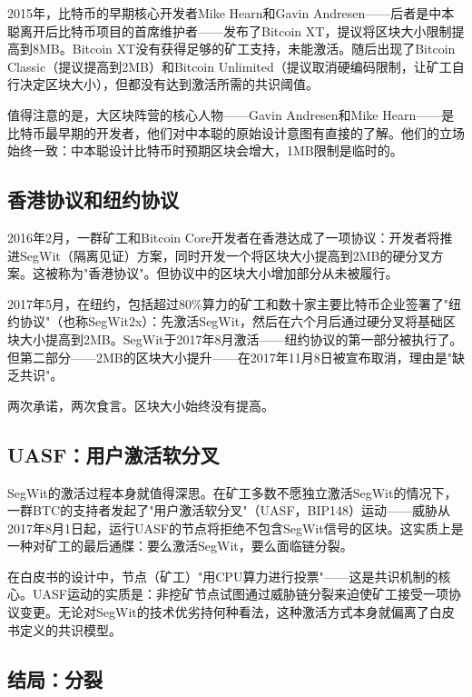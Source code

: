 \documentclass[a4paper,12pt,openany]{ctexbook}
\begin{document}
2015年，比特币的早期核心开发者Mike Hearn和Gavin Andresen——后者是中本聪离开后比特币项目的首席维护者——发布了Bitcoin XT，提议将区块大小限制提高到8MB。Bitcoin XT没有获得足够的矿工支持，未能激活。随后出现了Bitcoin Classic（提议提高到2MB）和Bitcoin Unlimited（提议取消硬编码限制，让矿工自行决定区块大小），但都没有达到激活所需的共识阈值。

值得注意的是，大区块阵营的核心人物——Gavin Andresen和Mike Hearn——是比特币最早期的开发者，他们对中本聪的原始设计意图有直接的了解。他们的立场始终一致：中本聪设计比特币时预期区块会增大，1MB限制是临时的。


\subsection*{香港协议和纽约协议}


2016年2月，一群矿工和Bitcoin Core开发者在香港达成了一项协议：开发者将推进SegWit（隔离见证）方案，同时开发一个将区块大小提高到2MB的硬分叉方案。这被称为"香港协议"。但协议中的区块大小增加部分从未被履行。

2017年5月，在纽约，包括超过80\%算力的矿工和数十家主要比特币企业签署了"纽约协议"（也称SegWit2x）：先激活SegWit，然后在六个月后通过硬分叉将基础区块大小提高到2MB。SegWit于2017年8月激活——纽约协议的第一部分被执行了。但第二部分——2MB的区块大小提升——在2017年11月8日被宣布取消，理由是"缺乏共识"。

两次承诺，两次食言。区块大小始终没有提高。


\subsection*{UASF：用户激活软分叉}


SegWit的激活过程本身就值得深思。在矿工多数不愿独立激活SegWit的情况下，一群BTC的支持者发起了"用户激活软分叉"（UASF，BIP148）运动——威胁从2017年8月1日起，运行UASF的节点将拒绝不包含SegWit信号的区块。这实质上是一种对矿工的最后通牒：要么激活SegWit，要么面临链分裂。

在白皮书的设计中，节点（矿工）"用CPU算力进行投票"——这是共识机制的核心。UASF运动的实质是：非挖矿节点试图通过威胁链分裂来迫使矿工接受一项协议变更。无论对SegWit的技术优劣持何种看法，这种激活方式本身就偏离了白皮书定义的共识模型。


\subsection*{结局：分裂}
\end{document}

